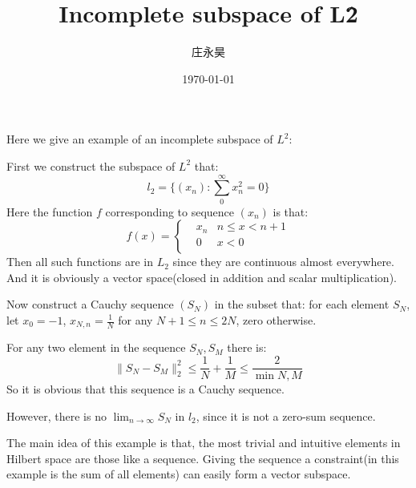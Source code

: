 \documentclass[UTF8, a4paper, linespread=1.5]{article}
\title{Incomplete subspace of L\^2}
\date{\today}
\author{庄永昊}
\begin{document}
\maketitle
    Here we give an example of an incomplete subspace of $L^2$: 

    First we construct the subspace of $L^2$ that: 
    $$l_2=\{(x_n):\sum_0^\infty x_n^2=0\}$$
    Here the function $f$ corresponding to sequence $(x_n)$ is that: 
    \begin{equation*}
        f(x)=\left\{
            \begin{aligned}
                &x_n&n\leq x<n+1\\
                &0&x<0\\
            \end{aligned}
            \right.
    \end{equation*}
    Then all such functions are in $L_2$ since they are continuous almost everywhere. 
    And it is obviously a vector space(closed in addition and scalar multiplication). 

    Now construct a Cauchy sequence $(S_N)$ in the subset that: for each element $S_N$, let $x_0=-1$, $x_{N,n}=\frac{1}{N}$ for any $N+1\leq n\leq 2N$, zero otherwise. 

    For any two element in the sequence $S_N,S_M$ there is: 
    $$\|S_N-S_M\|_2^2\leq \frac{1}{N}+\frac{1}{M}\leq \frac{2}{\min{N,M}}$$
    So it is obvious that this sequence is a Cauchy sequence. 

    However, there is no $\lim_{n\to\infty}S_N$ in $l_2$, since it is not a zero-sum sequence. 

    The main idea of this example is that, the most trivial and intuitive elements in Hilbert space are those like a sequence. 
    Giving the sequence a constraint(in this example is the sum of all elements) can easily form a vector subspace. 
\end{document}
